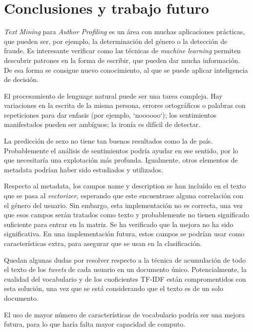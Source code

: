 \documentclass[11pt,a4paper]{article}
\begin{document}
\section{Conclusiones y trabajo futuro}
  
  {\em Text Mining} para {\em Author Profiling} es un \'area con muchas aplicaciones pr\'acticas, que pueden ser, por ejemplo, la determinaci\'on del g\'enero o la detecci\'on de fraude. Es interesante verificar como las t\'ecnicas de {\em machine learning} permiten descubrir patrones en la forma de escribir, que pueden dar mucha informaci\'on. De esa forma se consigue nuevo conocimiento, al que se puede aplicar inteligencia de decisi\'on.

  El procesamiento de lenguage natural puede ser una tarea compleja. Hay variaciones en la escrita de la misma persona, errores ortogr\'aficos o palabras con repeticiones para dar enfasis (por ejemplo, `noooooo`); los sentimientos manifestados pueden ser amb\'iguos; la iron\'ia es dif\'icil de detectar. 

  La predicci\'on de sexo no tiene tan buenos resultados como la de pa\'is. Probablemente el an\'alisis de sentimientos podr\'ia ayudar en ese sentido, por lo que necesitar\'ia una explotaci\'on m\'as profunda. Igualmente, otros elementos de metadata podr\'ian haber sido estudiados y utilizados. 

  Respecto al metadata, los campos {\ttfamily name} y {\ttfamily description} se han inclu\'ido en el texto que se pasa al {\em vectorizer}, esperando que este encuentrase alguna correlaci\'on con el g\'enero del usuario. Sin embargo, esta implementaci\'on no es correcta, una vez que esos campos ser\'an tratados como texto y probablemente no tienen significado suficiente para entrar en la matriz. Se ha verificado que la mejora no ha sido significativa. En una implementaci\'on futura, estos campos se podr\'ian usar como caracter\'isticas extra, para asegurar que se usan en la clasificaci\'on.
  
  Quedan algunas dudas por resolver respecto a la t\'ecnica de acumulaci\'on de todo el texto de los {\em tweets} de cada usuario en un documento \'unico. Potencialmente, la cualidad del vocabulario y de los cuoficientes TF-IDF est\'an compromentidos con esta soluci\'on, una vez que se est\'a considerando que el texto es de un solo documento.

  El uso de mayor n\'umero de caracter\'isticas de vocabulario podr\'ia ser una mejora futura, para lo que har\'ia falta mayor capacidad de computo.
\end{document}
